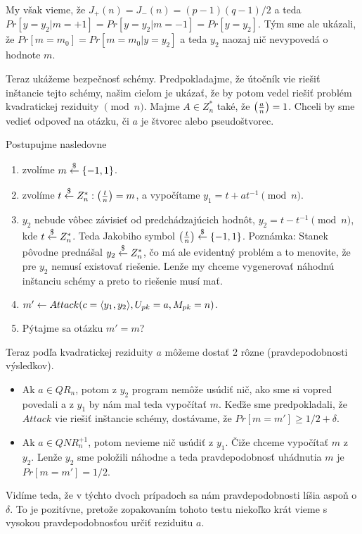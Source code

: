 My však vieme, že $J_{+}(n) = J_{-}(n) = (p-1)(q-1)/2$ a teda
$Pr[y=y_2| m=+1] = Pr[y=y_2 | m=-1] = Pr[y=y_2]$. Tým sme ale ukázali,
že $Pr[m=m_0] = Pr[m=m_0 | y=y_2]$ a teda $y_2$ naozaj nič nevypovedá
o hodnote $m$.

\medskip
Teraz ukážeme bezpečnosť schémy. Predpokladajme, že útočník vie riešiť
inštancie tejto schémy, našim cieľom je ukázať, že by potom vedel
riešiť problém kvadratickej reziduity $\pmod{n}$.
Majme $A \in Z_n^*$ také, že $\left( \frac{a}{n} \right)=1$. Chceli by sme vedieť
odpoveď na otázku, či $a$ je štvorec alebo pseudoštvorec.

Postupujme nasledovne
\begin{enumerate}
    \item zvolíme $m \overset{\$}{\leftarrow} \{-1,1\}$.
    \item zvolíme $t \overset{\$}{\leftarrow} Z_n^*: \left( \frac{t}{n} \right)=m$, a vypočítame
        $y_1 = t + a t^{-1} \pmod{n}$.
    \item $y_2$ nebude vôbec závisieť od predchádzajúcich hodnôt,
            $y_2 = t -  t^{-1} \pmod{n}$, kde $t \overset{\$}{\leftarrow} Z_n^*$.
            Teda Jakobiho symbol $\left( \frac{t}{n} \right) \overset{\$}{\leftarrow} \{-1,1\}$.
            Poznámka: Stanek pôvodne prednášal $y_2 \overset{\$}{\leftarrow} Z_n^*$,
            čo má ale evidentný problém a to menovite, že pre $y_2$
            nemusí existovať riešenie. Lenže my chceme vygenerovať
            náhodnú inštanciu schémy a preto to riešenie musí mať.
    \item $m' \leftarrow Attack(c=\langle y_1, y_2 \rangle, U_{pk}=a,M_{pk}=n)
            $.
    \item Pýtajme sa otázku $m'=m$?
\end{enumerate}
Teraz podľa kvadratickej reziduity $a$ môžeme dostať 2 rôzne
(pravdepodobnosti výsledkov).
\begin{itemize}
    \item Ak $a \in QR_{n}$, potom z $y_2$ program nemôže usúdiť nič,
    ako sme si vopred povedali a z $y_1$ by nám mal teda vypočítať
    $m$. Keďže sme predpokladali, že $Attack$ vie riešiť inštancie
    schémy, dostávame, že $Pr[m=m'] \ge 1/2 + \delta$.

    \item Ak $a \in QNR_{n}^{+1}$, potom nevieme nič usúdiť z $y_1$.
    Čiže chceme vypočítať $m$ z $y_2$. Lenže $y_2$ sme položili
    náhodne a teda pravdepodobnosť uhádnutia $m$ je $Pr[m=m'] = 1/2$.
\end{itemize}
Vidíme teda, že v týchto dvoch prípadoch sa nám pravdepodobnosti líšia
aspoň o $\delta$. To je pozitívne, pretože zopakovaním tohoto testu
niekoľko krát vieme s vysokou pravdepodobnosťou určiť reziduitu $a$.

